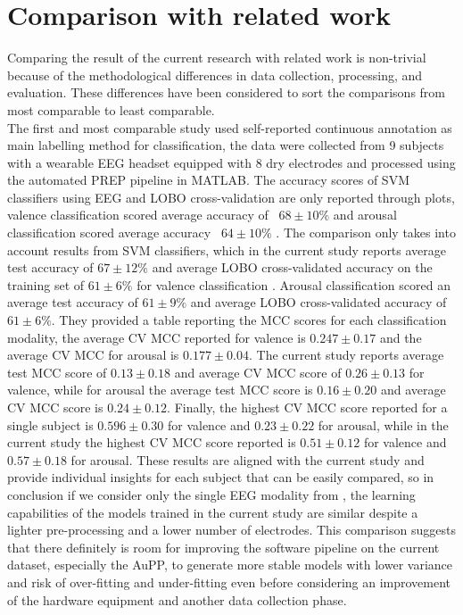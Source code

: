 \section{Comparison with related work}
\label{sec:comparison}
Comparing the result of the current research with related work is non-trivial because of the methodological differences in data collection, processing, and evaluation. These differences have been considered to sort the comparisons from most comparable to least comparable. 
\\
The first and most comparable study \cite{thammasan_multimodal_2017} used self-reported continuous annotation as main labelling method for classification, the data were collected from 9 subjects with a wearable EEG headset equipped with 8 dry electrodes and processed using the automated PREP pipeline in MATLAB. The accuracy scores of \ac{SVM} classifiers using EEG and \ac{LOBO} cross-validation are only reported through plots, valence classification scored average accuracy of ~\(68\pm10\%\) and arousal classification scored average accuracy ~\(64\pm10\%\) . The comparison only takes into account results from \ac{SVM} classifiers, which in the current study reports average test accuracy of \( 67\pm12\%\) and average LOBO cross-validated accuracy on the training set of \(61\pm6\% \)  for valence classification . Arousal classification scored an average test accuracy of  \( 61\pm9\%\) and average \ac{LOBO} cross-validated accuracy of \(61\pm6\% \). They provided a table reporting the \ac{MCC} scores for each classification modality, the average CV MCC reported for valence is \(0.247\pm0.17\) and the average \ac{CV MCC} for arousal is \(0.177\pm0.04\). The current study reports average test \ac{MCC} score of \(0.13\pm0.18\) and average \ac{CV MCC} score of \(0.26\pm0.13\) for valence, while for arousal the average test \ac{MCC} score is \(0.16\pm0.20\) and average CV MCC score is \(0.24\pm0.12\). Finally, the highest \ac{CV MCC} score reported for a single subject is \(0.596\pm0.30\) for valence and \(0.23\pm0.22\) for arousal, while in the current study the highest \ac{CV MCC} score reported is \(0.51\pm0.12\) for valence and \(0.57\pm0.18\) for arousal. These results are aligned with the current study and provide individual insights for each subject that can be easily compared, so in conclusion if we consider only the single EEG modality from \cite{thammasan_multimodal_2017}, the learning capabilities of the models trained in the current study are similar despite a lighter pre-processing and a lower number of electrodes. This comparison suggests that there definitely is room for improving the software pipeline on the current dataset, especially the \ac{AuPP}, to generate more stable models with lower variance and risk of over-fitting and under-fitting even before considering an improvement of the hardware equipment and another data collection phase.
